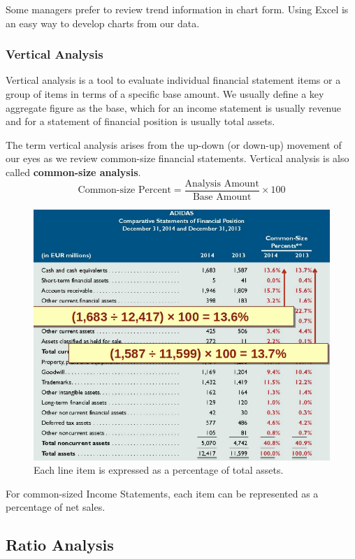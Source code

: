 \documentclass[../main.tex]{subfiles}
\begin{document}
	Some managers prefer to review trend information in chart form. Using Excel 
	is an easy way to develop charts from our data.
	
	\subsubsection{Vertical Analysis}
	
	Vertical analysis is a tool to evaluate individual financial statement 
	items or a group of items in terms of a specific base amount. We usually 
	define a key aggregate figure as the base, which for an income statement is 
	usually revenue and for a statement of financial position is usually total 
	assets.
	
	The term vertical analysis arises from the up-down (or down-up) movement of 
	our eyes as we review common-size financial statements. Vertical analysis 
	is also called \textbf{common-size analysis}.
	\[
	\text{Common-size Percent} = \frac{\text{Analysis Amount}}{\text{Base 
	Amount}} \times 100
	\]
	\begin{figure}[ht!]
		\centering
		\includegraphics[width=\columnwidth]{images/c12/vertical_analysis1.png}
		\caption{Each line item is expressed as a percentage of total 
		assets.}  	
	\end{figure}
	
	For common-sized Income Statements, each item can be represented as a 
	percentage of net sales.
	
	\subsection{Ratio Analysis}
	
\end{document}
